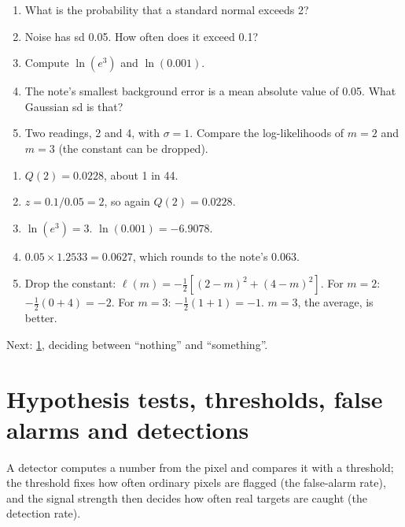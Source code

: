 \documentclass[11pt,a4paper,oneside,openany]{book}
\newcommand{\nextchapter}[1]{\par\medskip\noindent\hfill\textsf{\small Next: #1}\par}
\begin{document}
\begin{checkyourself}
\begin{enumerate}
\item What is the probability that a standard normal exceeds 2?
\item Noise has sd 0.05. How often does it exceed 0.1?
\item Compute $\ln(e^3)$ and $\ln(0.001)$.
\item The note's smallest background error is a mean absolute value of 0.05. What Gaussian sd is that?
\item Two readings, 2 and 4, with $\sigma=1$. Compare the log-likelihoods of $m=2$ and $m=3$ (the constant can be dropped).
\end{enumerate}
\end{checkyourself}

\begin{answers}
\begin{enumerate}
\item $Q(2)=0.0228$, about 1 in 44.
\item $z=0.1/0.05=2$, so again $Q(2)=0.0228$.
\item $\ln(e^3)=3$. $\ln(0.001)=-6.9078$.
\item $0.05\times1.2533=0.0627$, which rounds to the note's 0.063.
\item Drop the constant: $\ell(m)=-\frac12[(2-m)^2+(4-m)^2]$. For $m=2$: $-\frac12(0+4)=-2$. For $m=3$: $-\frac12(1+1)=-1$.
  $m=3$, the average, is better.
\end{enumerate}
\end{answers}

\nextchapter{\cref{ch:tests}, deciding between ``nothing'' and ``something''.}

\chapter{Hypothesis tests, thresholds, false alarms and detections}
\label{ch:tests}

\begin{onething}
A detector computes a number from the pixel and compares it with a threshold; the threshold fixes how often ordinary pixels are
flagged (the false-alarm rate), and the signal strength then decides how often real targets are caught (the detection rate).
\end{onething}
\end{document}
